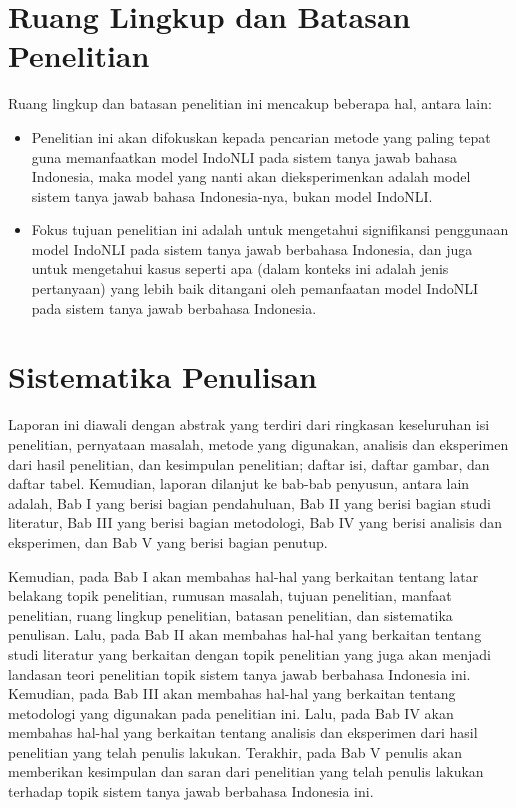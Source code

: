 \section{Ruang Lingkup dan Batasan Penelitian}
Ruang lingkup dan batasan penelitian ini mencakup beberapa hal, antara lain:

\begin{itemize}

    \item Penelitian ini akan difokuskan kepada pencarian metode yang paling tepat guna memanfaatkan model IndoNLI pada sistem tanya jawab bahasa Indonesia, maka model yang nanti akan dieksperimenkan adalah model sistem tanya jawab bahasa Indonesia-nya, bukan model IndoNLI.

    \item Fokus tujuan penelitian ini adalah untuk mengetahui signifikansi penggunaan model IndoNLI pada sistem tanya jawab berbahasa Indonesia, dan juga untuk mengetahui kasus seperti apa (dalam konteks ini adalah jenis pertanyaan) yang lebih baik ditangani oleh pemanfaatan model IndoNLI pada sistem tanya jawab berbahasa Indonesia.
    
\end{itemize}

\section{Sistematika Penulisan}
Laporan ini diawali dengan abstrak yang terdiri dari ringkasan keseluruhan isi penelitian, pernyataan masalah, metode yang digunakan, analisis dan eksperimen dari hasil penelitian, dan kesimpulan penelitian; daftar isi, daftar gambar, dan daftar tabel. Kemudian, laporan dilanjut ke bab-bab penyusun, antara lain adalah, Bab I yang berisi bagian pendahuluan, Bab II yang berisi bagian studi literatur, Bab III yang berisi bagian metodologi, Bab IV yang berisi analisis dan eksperimen, dan Bab V yang berisi bagian penutup. 

Kemudian, pada Bab I akan membahas hal-hal yang berkaitan tentang latar belakang topik penelitian, rumusan masalah, tujuan penelitian, manfaat penelitian, ruang lingkup penelitian, batasan penelitian, dan sistematika penulisan. Lalu, pada Bab II akan membahas hal-hal yang berkaitan tentang studi literatur yang berkaitan dengan topik penelitian yang juga akan menjadi landasan teori penelitian topik sistem tanya jawab berbahasa Indonesia ini. Kemudian, pada Bab III akan membahas hal-hal yang berkaitan tentang metodologi yang digunakan pada penelitian ini. Lalu, pada Bab IV akan membahas hal-hal yang berkaitan tentang analisis dan eksperimen dari hasil penelitian yang telah penulis lakukan. Terakhir, pada Bab V penulis akan memberikan kesimpulan dan saran dari penelitian yang telah penulis lakukan terhadap topik sistem tanya jawab berbahasa Indonesia ini.